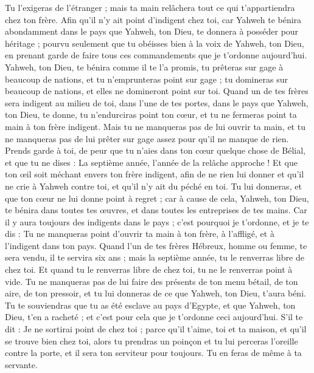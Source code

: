 \begin{multicols}{2}
Tu l’exigeras de l'étranger ; mais ta main relâchera tout ce qui t’appartiendra chez ton frère.
Afin qu’il n'y ait point d’indigent chez toi, car Yahweh te bénira abondamment dans le pays que Yahweh, ton Dieu, te donnera à posséder pour héritage ;
pourvu seulement que tu obéisses bien à la voix de Yahweh, ton Dieu, en prenant garde de faire tous ces commandements que je t’ordonne aujourd'hui.
Yahweh, ton Dieu, te bénira comme il te l’a promis, tu prêteras sur gage à beaucoup de nations, et tu n'emprunteras point sur gage ; tu domineras sur beaucoup de nations, et elles ne domineront point sur toi.
Quand un de tes frères sera indigent au milieu de toi, dans l’une de tes portes, dans le pays que Yahweh, ton Dieu, te donne, tu n'endurciras point ton cœur, et tu ne fermeras point ta main à ton frère indigent.
Mais tu ne manqueras pas de lui ouvrir ta main, et tu ne manqueras pas de lui prêter sur gage assez pour qu’il ne manque de rien.
Prends garde à toi, de peur que tu n'aies dans ton cœur quelque chose de Bélial, et que tu ne dises : La septième année, l'année de la relâche approche ! Et que ton œil soit méchant envers ton frère indigent, afin de ne rien lui donner et qu’il ne crie à Yahweh contre toi, et qu'il n'y ait du péché en toi.
Tu lui donneras, et que ton cœur ne lui donne point à regret ; car à cause de cela, Yahweh, ton Dieu, te bénira dans toutes tes œuvres, et dans toutes les entreprises de tes mains.
Car il y aura toujours des indigents dans le pays ; c'est pourquoi je t’ordonne, et je te dis : Tu ne manqueras point d'ouvrir ta main à ton frère, à l'affligé, et à l’indigent dans ton pays.
Quand l’un de tes frères Hébreux, homme ou femme, te sera vendu, il te servira six ans ; mais la septième année, tu le renverras libre de chez toi.
Et quand tu le renverras libre de chez toi, tu ne le renverras point à vide.
Tu ne manqueras pas de lui faire des présents de ton menu bétail, de ton aire, de ton pressoir, et tu lui donneras de ce que Yahweh, ton Dieu, t'aura béni.
Tu te souviendras que tu as été esclave au pays d'Egypte, et que Yahweh, ton Dieu, t'en a racheté ; et c'est pour cela que je t’ordonne ceci aujourd'hui.
S’il te dit : Je ne sortirai point de chez toi ; parce qu'il t'aime, toi et ta maison, et qu'il se trouve bien chez toi,
alors tu prendras un poinçon et tu lui perceras l'oreille contre la porte, et il sera ton serviteur pour toujours. Tu en feras de même à ta servante.

\end{multicols}
